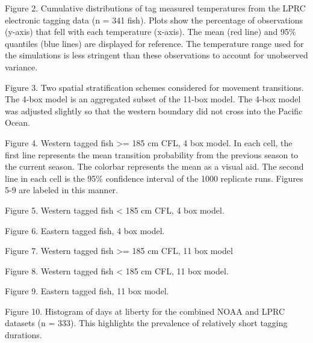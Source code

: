 \documentclass[
  authoryear,
  preprint,
  5p,
  onecolumn]{elsarticle}
\begin{document}
Figure 2. Cumulative distributions of tag measured temperatures from the
LPRC electronic tagging data (n = 341 fish). Plots show the percentage
of observations (y-axis) that fell with each temperature (x-axis). The
mean (red line) and 95\% quantiles (blue lines) are displayed for
reference. The temperature range used for the simulations is less
stringent than these observations to account for unobserved variance.

Figure 3. Two spatial stratification schemes considered for movement
transitions. The 4-box model is an aggregated subset of the 11-box
model. The 4-box model was adjusted slightly so that the western
boundary did not cross into the Pacific Ocean.

Figure 4. Western tagged fish \textgreater= 185 cm CFL, 4 box model. In
each cell, the first line represents the mean transition probability
from the previous season to the current season. The colorbar represents
the mean as a visual aid. The second line in each cell is the 95\%
confidence interval of the 1000 replicate runs. Figures 5-9 are labeled
in this manner.  

Figure 5. Western tagged fish \textless{} 185 cm CFL, 4 box model.  

Figure 6. Eastern tagged fish, 4 box model.

Figure 7. Western tagged fish \textgreater= 185 cm CFL, 11 box model

Figure 8. Western tagged fish \textless{} 185 cm CFL, 11 box model.

Figure 9. Eastern tagged fish, 11 box model.  

Figure 10. Histogram of days at liberty for the combined NOAA and LPRC
datasets (n = 333). This highlights the prevalence of relatively short
tagging durations.
\end{document}

